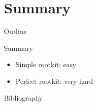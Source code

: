 \documentclass[]{beamer}
\begin{document}
\section{Summary}
\begin{frame}[t]{Outline}
\tableofcontents[currentsection]
\end{frame}

\begin{frame}[t]{Summary}
\begin{itemize}
  \item Simple rootkit: easy
  \item Perfect rootkit: very hard
\end{itemize}
\end{frame}

\begin{frame}[t]{Bibliography}
\nocite{a1}
\nocite{b2}
\nocite{c3}
\nocite{d4}
\nocite{e5}
\nocite{f6}

\begingroup
\tiny
{}



\endgroup
\end{frame}
\end{document}
